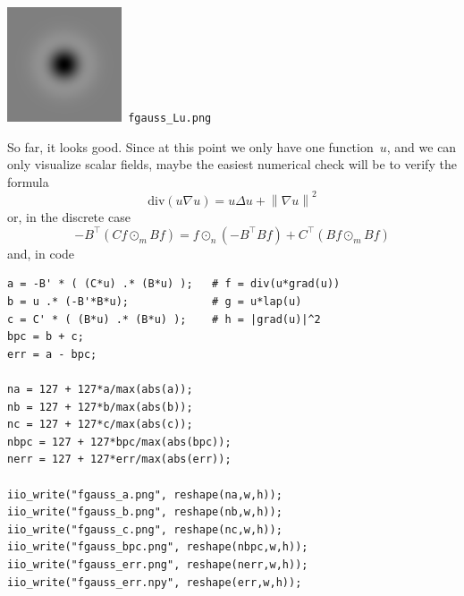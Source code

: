 \includegraphics{fgauss_Lu.png}\verb+ fgauss_Lu.png+

So far, it looks good.  Since at this point we only have one function~$u$,
and we can only visualize scalar fields, maybe the easiest numerical check
will be to verify the formula
\[
	\mathrm{div}\left(u\nabla u\right) = u\Delta u+\left\|\nabla
	u\right\|^2
\]
or, in the discrete case
\[
	-B^\top\left(Cf\odot_mBf\right)
	=
	f\odot_n\left(-B^\top B f\right)
	+C^\top\left(Bf\odot_mBf\right)
\]
and, in code
\begin{verbatim}
a = -B' * ( (C*u) .* (B*u) );   # f = div(u*grad(u))
b = u .* (-B'*B*u);             # g = u*lap(u)
c = C' * ( (B*u) .* (B*u) );    # h = |grad(u)|^2
bpc = b + c;
err = a - bpc;

na = 127 + 127*a/max(abs(a));
nb = 127 + 127*b/max(abs(b));
nc = 127 + 127*c/max(abs(c));
nbpc = 127 + 127*bpc/max(abs(bpc));
nerr = 127 + 127*err/max(abs(err));

iio_write("fgauss_a.png", reshape(na,w,h));
iio_write("fgauss_b.png", reshape(nb,w,h));
iio_write("fgauss_c.png", reshape(nc,w,h));
iio_write("fgauss_bpc.png", reshape(nbpc,w,h));
iio_write("fgauss_err.png", reshape(nerr,w,h));
iio_write("fgauss_err.npy", reshape(err,w,h));
\end{verbatim}

